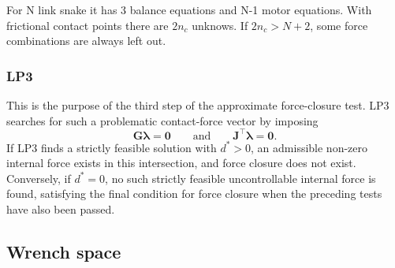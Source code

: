 For N link snake it has 3 balance equations and N-1 motor equations. With frictional contact points there are $2n_c$ unknows. If $2n_c > N+2$, some force combinations are always left out.
\subsubsection{LP3}
\label{sec:lp3}

This is the purpose of the third step of the approximate force-closure
test. LP3 searches for such a problematic contact-force vector by imposing
\begin{equation}
    \boldsymbol{G}\boldsymbol{\lambda}=\mathbf{0}
    \qquad \text{and} \qquad
    \boldsymbol{J}^\top\boldsymbol{\lambda}=\mathbf{0}.
\end{equation}
If LP3 finds a strictly feasible solution with $d^*>0$, an admissible
non-zero internal force exists in this intersection, and force closure does
not exist. Conversely, if $d^*=0$, no such strictly feasible uncontrollable
internal force is found, satisfying the final condition for force closure
when the preceding tests have also been passed.


\subsection{Wrench space}
